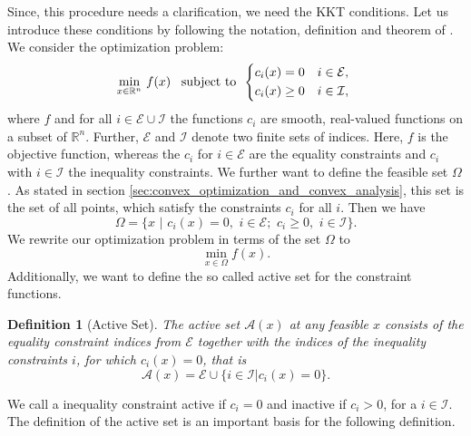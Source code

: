 \documentclass{scrreprt}
\newtheorem{definition}[theorem]{Definition}
\begin{document}
            Since, this procedure needs a clarification, we need the KKT conditions. Let us introduce these conditions by following the notation, definition and theorem of \cite{Nocedal-Wright}. We consider the optimization problem:
                \begin{equation}
                    \min_{x \in \mathbb{R}^{n}} \, f(x) \,\,\,\,\, \textnormal{subject to} \,\,\,
                    \begin{dcases*}
                        c_{i}(x) = 0 & $i \in \mathcal{E}$, \\
                        c_{i}(x) \ge 0 & $i \in \mathcal{I}$,
                    \end{dcases*}
                    \label{eq:basic_optimization_problem}
                \end{equation}
            where $f$ and for all $i \in \mathcal{E} \cup \mathcal{I}$ the functions $c_{i}$ are smooth, real-valued functions on a subset of $\mathbb{R}^{n}$. Further, $\mathcal{E}$ and $\mathcal{I}$ denote two finite sets of indices. Here, $f$ is the objective function, whereas the $c_{i}$ for $i \in \mathcal{E}$ are the equality constraints and $c_{i}$ with $i \in \mathcal{I}$ the inequality constraints. We further want to define the feasible set $\Omega$. As stated in section \ref{sec:convex_optimization_and_convex_analysis}, this set is the set of all points, which satisfy the constraints $c_{i}$ for all $i$. Then we have
                $$
                    \Omega = \{ x \,\, | \,\, c_{i}(x) = 0, \,\, i \in \mathcal{E}; \,\, c_{i} \ge 0, \,\, i \in \mathcal{I} \}.
                $$
            We rewrite our optimization problem in terms of the set $\Omega$ to
                $$
                    \min_{x \in \Omega} f(x).
                $$
            Additionally, we want to define the so called active set for the constraint functions.
            \begin{definition}[Active Set]
                \label{def:active_set}
                The active set $\mathcal{A}(x)$ at any feasible $x$ consists of the equality constraint indices from $\mathcal{E}$ together with the indices of the inequality constraints $i$, for which $c_{i}(x) = 0$, that is
                    $$
                        \mathcal{A}(x) = \mathcal{E} \cup \{ i \in \mathcal{I} | c_{i}(x) = 0 \}.
                    $$
            \end{definition}

            We call a inequality constraint active if $c_{i} = 0$ and inactive if $c_{i} > 0$, for a $i \in \mathcal{I}$. The definition of the active set is an important basis for the following definition.
\end{document}
